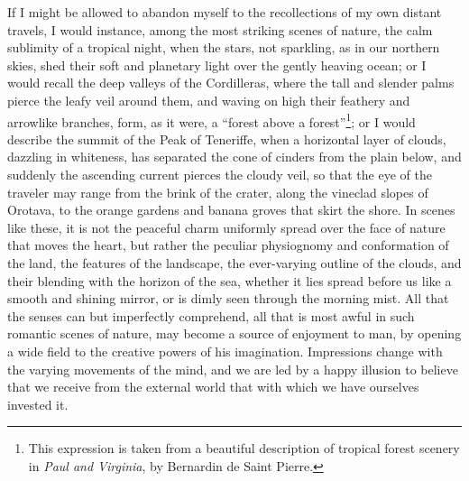 If I might be allowed to abandon myself to the recollections of my own distant travels, I would instance, among the most striking scenes of nature, the calm sublimity of a tropical night, when the stars, not sparkling, as in our northern skies, shed their soft and planetary light over the gently heaving ocean; or I would recall the deep valleys of the Cordilleras, where the tall and slender palms pierce the leafy veil around them, and waving on high their feathery and arrowlike branches, form, as it were, a ``forest above a forest''\footnote{This expression is taken from a beautiful description of tropical forest scenery in \emph{Paul and Virginia}, by Bernardin de Saint Pierre.}; or I would describe the summit of the Peak of Teneriffe, when a horizontal layer of clouds, dazzling in whiteness, has separated the cone of cinders from the plain below, and suddenly the ascending current pierces the cloudy veil, so that the eye of the traveler may range from the brink of the crater, along the vineclad slopes of Orotava, to the orange gardens and banana groves that skirt the shore. In scenes like these, it is not the peaceful charm uniformly spread over the face of nature that moves the heart, but rather the peculiar physiognomy and conformation of the land, the features of the landscape, the ever-varying outline of the clouds, and their blending with the horizon of the sea, whether it lies spread before us like a smooth and shining mirror, or is dimly seen through the morning mist. All that the senses can but imperfectly comprehend, all that is most awful in such romantic scenes of nature, may become a source of enjoyment to man, by opening a wide field to the creative powers of his imagination. Impressions change with the varying movements of the mind, and we are led by a happy illusion to believe that we receive from the external world that with which we have ourselves invested it.

